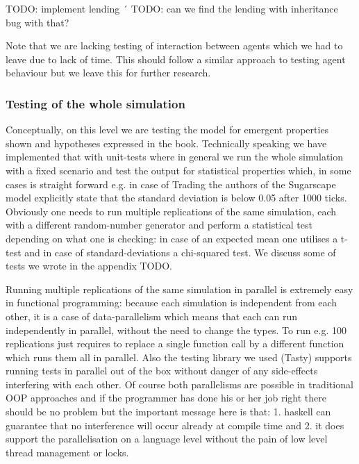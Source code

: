 TODO: implement lending
´
TODO: can we find the lending with inheritance bug with that?

Note that we are lacking testing of interaction between agents which we had to leave due to lack of time. This should follow a similar approach to testing agent behaviour but we leave this for further research.

\subsubsection{Testing of the whole simulation}
Conceptually, on this level we are testing the model for emergent properties shown and hypotheses expressed in the book. Technically speaking we have implemented that with unit-tests where in general we run the whole simulation with a fixed scenario and test the output for statistical properties which, in some cases is straight forward e.g. in case of Trading the authors of the Sugarscape model explicitly state that the standard deviation is below 0.05 after 1000 ticks.
Obviously one needs to run multiple replications of the same simulation, each with a different random-number generator and perform a statistical test depending on what one is checking: in case of an expected mean one utilises a t-test and in case of standard-deviations a chi-squared test. We discuss some of tests we wrote in the appendix TODO. 

Running multiple replications of the same simulation in parallel is extremely easy in functional programming: because each simulation is independent from each other, it is a case of data-parallelism which means that each can run independently in parallel, without the need to change the types. To run e.g. 100 replications just requires to replace a single function call by a different function which runs them all in parallel. Also the testing library we used (Tasty) supports running tests in parallel out of the box without danger of any side-effects interfering with each other. 
Of course both parallelisms are possible in traditional OOP approaches and if the programmer has done his or her job right there should be no problem but the important message here is that: 1. haskell can guarantee that no interference will occur already at compile time and 2. it does support the parallelisation on a language level without the pain of low level thread management or locks.